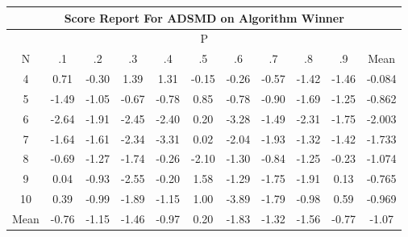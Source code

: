 \documentclass[11pt,a4paper]{report}
\begin{document}
\begin{longtable}{ | c || c | c | c | c | c | c | c | c | c || c |}
\hline
\multicolumn{11}{|c|}{ Score Report For ADSMD on Algorithm Winner} \\
\hline
\multicolumn{11}{|c|}{ P } \\
\hline
N & .1 & .2 & .3 & .4 & .5 & .6 & .7 & .8 & .9 & Mean\\
 \hline
 \hline
 \endhead
  4 &  \cellcolor[HTML]{EFEFFF} 0.71 &  \cellcolor[HTML]{FFF7F7} -0.30 &  \cellcolor[HTML]{DFDFFF} 1.39 &  \cellcolor[HTML]{DFDFFF} 1.31 &  \cellcolor[HTML]{FFFFFF} -0.15 &  \cellcolor[HTML]{FFF7F7} -0.26 &  \cellcolor[HTML]{FFEFEF} -0.57 &  \cellcolor[HTML]{FFDFDF} -1.42 &  \cellcolor[HTML]{FFD7D7} -1.46 & -0.084 \\
  5 &  \cellcolor[HTML]{FFD7D7} -1.49 &  \cellcolor[HTML]{FFE7E7} -1.05 &  \cellcolor[HTML]{FFEFEF} -0.67 &  \cellcolor[HTML]{FFEFEF} -0.78 &  \cellcolor[HTML]{E7E7FF} 0.85 &  \cellcolor[HTML]{FFEFEF} -0.78 &  \cellcolor[HTML]{FFE7E7} -0.90 &  \cellcolor[HTML]{FFD7D7} -1.69 &  \cellcolor[HTML]{FFDFDF} -1.25 & -0.862 \\
  6 &  \cellcolor[HTML]{FFBFBF} -2.64 &  \cellcolor[HTML]{FFCFCF} -1.91 &  \cellcolor[HTML]{FFBFBF} -2.45 &  \cellcolor[HTML]{FFBFBF} -2.40 &  \cellcolor[HTML]{F7F7FF} 0.20 &  \cellcolor[HTML]{FFAFAF} -3.28 &  \cellcolor[HTML]{FFD7D7} -1.49 &  \cellcolor[HTML]{FFC7C7} -2.31 &  \cellcolor[HTML]{FFD7D7} -1.75 & -2.003 \\
  7 &  \cellcolor[HTML]{FFD7D7} -1.64 &  \cellcolor[HTML]{FFD7D7} -1.61 &  \cellcolor[HTML]{FFC7C7} -2.34 &  \cellcolor[HTML]{FFAFAF} -3.31 &  \cellcolor[HTML]{FFFFFF} 0.02 &  \cellcolor[HTML]{FFCFCF} -2.04 &  \cellcolor[HTML]{FFCFCF} -1.93 &  \cellcolor[HTML]{FFDFDF} -1.32 &  \cellcolor[HTML]{FFDFDF} -1.42 & -1.733 \\
  8 &  \cellcolor[HTML]{FFEFEF} -0.69 &  \cellcolor[HTML]{FFDFDF} -1.27 &  \cellcolor[HTML]{FFD7D7} -1.74 &  \cellcolor[HTML]{FFF7F7} -0.26 &  \cellcolor[HTML]{FFC7C7} -2.10 &  \cellcolor[HTML]{FFDFDF} -1.30 &  \cellcolor[HTML]{FFE7E7} -0.84 &  \cellcolor[HTML]{FFDFDF} -1.25 &  \cellcolor[HTML]{FFF7F7} -0.23 & -1.074 \\
  9 &  \cellcolor[HTML]{FFFFFF} 0.04 &  \cellcolor[HTML]{FFE7E7} -0.93 &  \cellcolor[HTML]{FFBFBF} -2.55 &  \cellcolor[HTML]{FFF7F7} -0.20 &  \cellcolor[HTML]{D7D7FF} 1.58 &  \cellcolor[HTML]{FFDFDF} -1.29 &  \cellcolor[HTML]{FFCFCF} -1.75 &  \cellcolor[HTML]{FFCFCF} -1.91 &  \cellcolor[HTML]{FFFFFF} 0.13 & -0.765 \\
  10 &  \cellcolor[HTML]{F7F7FF} 0.39 &  \cellcolor[HTML]{FFE7E7} -0.99 &  \cellcolor[HTML]{FFCFCF} -1.89 &  \cellcolor[HTML]{FFDFDF} -1.15 &  \cellcolor[HTML]{E7E7FF} 1.00 &  \cellcolor[HTML]{FF9F9F} -3.89 &  \cellcolor[HTML]{FFCFCF} -1.79 &  \cellcolor[HTML]{FFE7E7} -0.98 &  \cellcolor[HTML]{EFEFFF} 0.59 & -0.969 \\
 \hline
 \hline
Mean &  \cellcolor[HTML]{FFEFEF} -0.76 &  \cellcolor[HTML]{FFDFDF} -1.15 &  \cellcolor[HTML]{FFD7D7} -1.46 &  \cellcolor[HTML]{FFE7E7} -0.97 &  \cellcolor[HTML]{F7F7FF} 0.20 &  \cellcolor[HTML]{FFCFCF} -1.83 &  \cellcolor[HTML]{FFDFDF} -1.32 &  \cellcolor[HTML]{FFD7D7} -1.56 &  \cellcolor[HTML]{FFEFEF} -0.77 &  \cellcolor[HTML]{FFE7E7} -1.07
\end{longtable}
\end{document}

